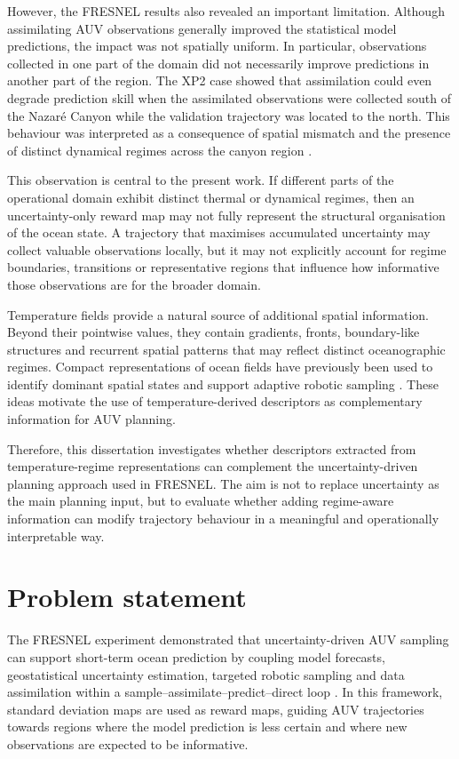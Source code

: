 However, the FRESNEL results also revealed an important limitation. Although assimilating AUV observations generally improved the statistical model predictions, the impact was not spatially uniform. In particular, observations collected in one part of the domain did not necessarily improve predictions in another part of the region. The XP2 case showed that assimilation could even degrade prediction skill when the assimilated observations were collected south of the Nazaré Canyon while the validation trajectory was located to the north. This behaviour was interpreted as a consequence of spatial mismatch and the presence of distinct dynamical regimes across the canyon region \cite{mendes2025oceanmodeldriven}.

This observation is central to the present work. If different parts of the operational domain exhibit distinct thermal or dynamical regimes, then an uncertainty-only reward map may not fully represent the structural organisation of the ocean state. A trajectory that maximises accumulated uncertainty may collect valuable observations locally, but it may not explicitly account for regime boundaries, transitions or representative regions that influence how informative those observations are for the broader domain.

Temperature fields provide a natural source of additional spatial information. Beyond their pointwise values, they contain gradients, fronts, boundary-like structures and recurrent spatial patterns that may reflect distinct oceanographic regimes. Compact representations of ocean fields have previously been used to identify dominant spatial states and support adaptive robotic sampling \cite{fossum2020compact,ge2023watermasses}. These ideas motivate the use of temperature-derived descriptors as complementary information for AUV planning.

Therefore, this dissertation investigates whether descriptors extracted from temperature-regime representations can complement the uncertainty-driven planning approach used in FRESNEL. The aim is not to replace uncertainty as the main planning input, but to evaluate whether adding regime-aware information can modify trajectory behaviour in a meaningful and operationally interpretable way.


\section{Problem statement} \label{sec:problem_statement}

The FRESNEL experiment demonstrated that uncertainty-driven AUV sampling can support short-term ocean prediction by coupling model forecasts, geostatistical uncertainty estimation, targeted robotic sampling and data assimilation within a sample--assimilate--predict--direct loop \cite{mendes2025oceanmodeldriven}. In this framework, standard deviation maps are used as reward maps, guiding AUV trajectories towards regions where the model prediction is less certain and where new observations are expected to be informative.

